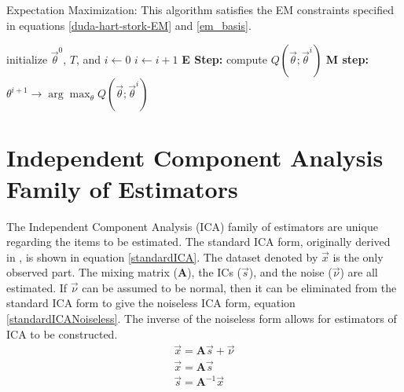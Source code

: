 \documentclass[11pt]{article}
\begin{document}
\begin{algorithm}
\caption{Expectation Maximization:  This algorithm satisfies the EM constraints specified in equations \ref{duda-hart-stork-EM} and \ref{em_basis}.}
\label{alg:expectation-maximization}
\begin{algorithmic}
	\STATE initialize $\vec{\theta}^0$, $T$, and $i \leftarrow 0$
	\REPEAT
		\STATE $i \leftarrow i + 1$
		\STATE \textbf{E Step:} compute $Q(\vec{\theta} ; \vec{\theta}^i)$ 
		\STATE \textbf{M step:} $\theta ^{i+1} \rightarrow \arg \max _{\theta} Q(\vec{\theta} ; \vec{\theta} ^i)$ 
\end{algorithmic}
\end{algorithm}



\section{Independent Component Analysis Family of Estimators}\label{mutual-independence}
The Independent Component Analysis (ICA) family of estimators are unique regarding the items to be estimated.   The standard ICA form, originally derived in \cite[151]{appo-ica-book} , is shown in equation \ref{standardICA}.  The dataset denoted by $\vec{x}$ is the only observed part.  The mixing matrix ($\mathbf{A}$), the ICs ($\vec{s}$), and the noise ($\vec{\nu}$) are all estimated.  If $\vec{\nu}$ can be assumed to be normal, then it can be eliminated from the standard ICA form to give the %
noiseless ICA form, equation \ref{standardICANoiseless}.  The inverse of the noiseless form allows for estimators of ICA to be constructed.  
\begin{eqnarray}
\vec{x} = \mathbf{A}\vec{s} + \vec{\nu} \label{standardICA} \\
\vec{x} = \mathbf{A}\vec{s} \label{standardICANoiseless} \\
\vec{s} = \mathbf{A}^{-1} \vec{x} \label{standardICAInverse} 
\end{eqnarray}
\end{document}

